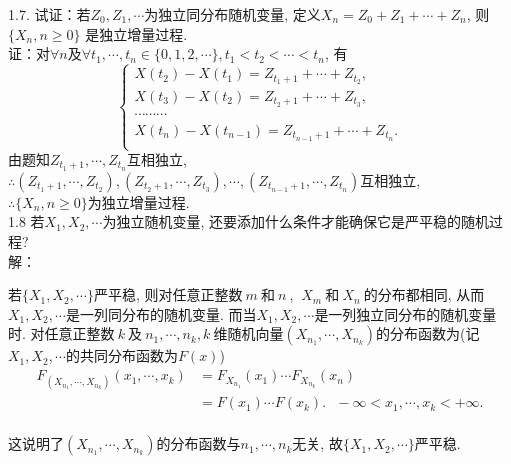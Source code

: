 1.7. 试证：若$Z_0, Z_1,\cdots $为独立同分布随机变量, 定义$ X_n = Z_0 + Z_1 + \cdots + Z_n$, 则$\{X_n, n \geqslant 0\}$ 是独立增量过程.\\
	证：对$\forall n$及$\forall t_1, \cdots, t_n\in \{0,1,2,\cdots\}, t_1 < t_2 < \cdots < t_n$, 有
	\[
	\begin{cases}
		X(t_2) - X(t_1) = Z_{t_1+1}+\cdots+Z_{t_2},\\
		X(t_3) - X(t_2) = Z_{t_2+1}+\cdots+Z_{t_3},\\
		\cdots\cdots\cdots\\
		X(t_n) - X(t_{n-1}) = Z_{t_{n-1}+1}+\cdots+Z_{t_n}.\\
	\end{cases}
	\]
	由题知$Z_{t_1+1}, \cdots, Z_{t_n}$互相独立, \\
	$\therefore(Z_{t_1+1},\cdots,Z_{t_2}),(Z_{t_2+1},\cdots,Z_{t_3}),\cdots,(Z_{t_{n-1}+1},\cdots,Z_{t_n})$互相独立,\\
	$\therefore \{X_n, n \geqslant 0\}$为独立增量过程.\\


1.8 若$X_1, X_2,\cdots $为独立随机变量, 还要添加什么条件才能确保它是严平稳的随机过程? \\
	解：

	若$\{X_1, X_2, \cdots \}$严平稳, 则对任意正整数$~m~$和$~n~$, $~X_m~$和$~X_n~$的分布都相同, 从而$X_1, X_2, \cdots $是一列同分布的随机变量. 而当$X_1, X_2, \cdots $是一列独立同分布的随机变量时. 对任意正整数$~k~$及$~n_1, \cdots,n_k, k~$维随机向量$\left(X_{n_1}, \cdots, X_{n_k}\right)$的分布函数为(记$X_1, X_2, \cdots $的共同分布函数为$F(x)$)\\
	\[
	\begin{split}
	F_{\left(X_{n_1}, \cdots, X_{n_k}\right)}(x_1, \cdots, x_k) & = F_{X_{n_1}}(x_1)\cdots F_{X_{n_k}}(x_n)\\
											& = F(x_1)\cdots F(x_k).~~~-\infty < x_1,\cdots,x_k < +\infty.\\
	\end{split}
	\]
	\begin{center}
	这说明了$(X_{n_1},\cdots,X_{n_k})$的分布函数与$n_1, \cdots, n_k$无关, 故$\{X_1, X_2, \cdots\}$严平稳.\\
	\end{center}


